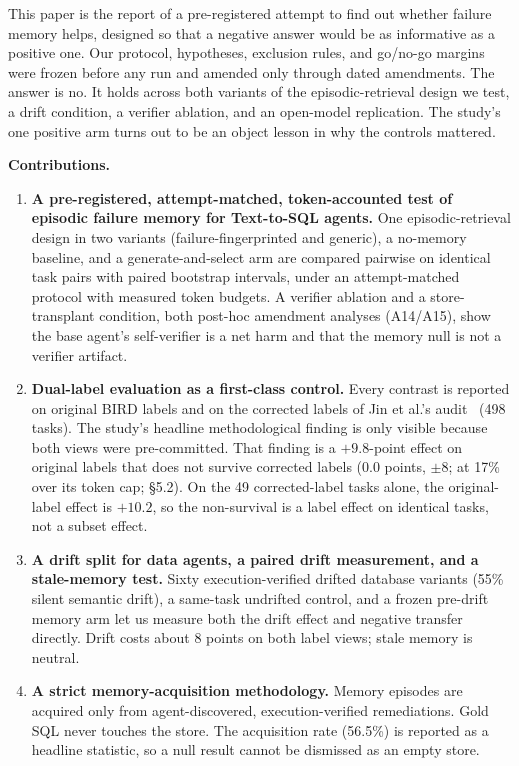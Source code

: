 \documentclass[sigconf, nonacm]{acmart}
\begin{document}
This paper is the report of a pre-registered attempt to find out whether failure memory helps, designed so that a negative answer would be as informative as a positive one. Our protocol, hypotheses, exclusion rules, and go/no-go margins were frozen before any run and amended only through dated amendments. The answer is no. It holds across both variants of the episodic-retrieval design we test, a drift condition, a verifier ablation, and an open-model replication. The study's one positive arm turns out to be an object lesson in why the controls mattered.

\textbf{Contributions.}
\begin{enumerate}
\item \textbf{A pre-registered, attempt-matched, token-accounted test of episodic failure memory for Text-to-SQL agents.} One episodic-retrieval design in two variants (failure-fingerprinted and generic), a no-memory baseline, and a generate-and-select arm are compared pairwise on identical task pairs with paired bootstrap intervals, under an attempt-matched protocol with measured token budgets. A verifier ablation and a store-transplant condition, both post-hoc amendment analyses (A14/A15), show the base agent's self-verifier is a net harm and that the memory null is not a verifier artifact.
\item \textbf{Dual-label evaluation as a first-class control.} Every contrast is reported on original BIRD labels and on the corrected labels of Jin et al.'s audit~\cite{jin} (498 tasks). The study's headline methodological finding is only visible because both views were pre-committed. That finding is a $+9.8$-point effect on original labels that does not survive corrected labels (0.0 points, $\pm$8; at 17\% over its token cap; \S5.2). On the 49 corrected-label tasks alone, the original-label effect is $+10.2$, so the non-survival is a label effect on identical tasks, not a subset effect.
\item \textbf{A drift split for data agents, a paired drift measurement, and a stale-memory test.} Sixty execution-verified drifted database variants (55\% silent semantic drift), a same-task undrifted control, and a frozen pre-drift memory arm let us measure both the drift effect and negative transfer directly. Drift costs about 8 points on both label views; stale memory is neutral.
\item \textbf{A strict memory-acquisition methodology.} Memory episodes are acquired only from agent-discovered, execution-verified remediations. Gold SQL never touches the store. The acquisition rate (56.5\%) is reported as a headline statistic, so a null result cannot be dismissed as an empty store.
\end{enumerate}
\end{document}
